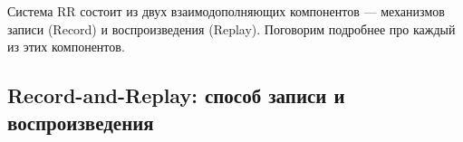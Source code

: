 Система RR состоит из двух взаимодополняющих компонентов
— механизмов записи (Record) и воспроизведения (Replay). Поговорим подробнее
про каждый из этих компонентов.


\subsection{Record-and-Replay: способ записи и воспроизведения}






